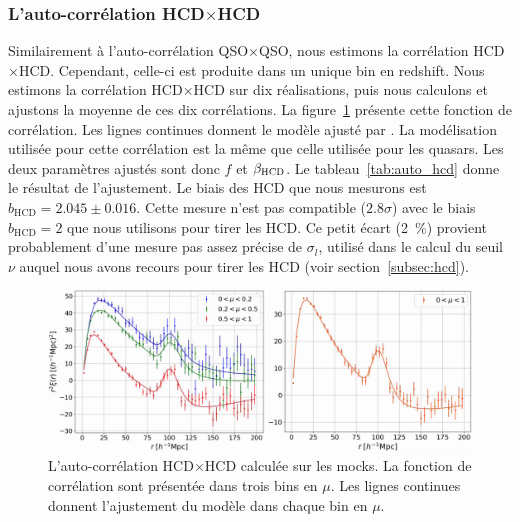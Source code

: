
\subsubsection{L'auto-corrélation HCD$\times$HCD}

Similairement à l'auto-corrélation QSO$\times$QSO, nous estimons la corrélation HCD$\times$HCD. Cependant, celle-ci est produite dans un unique bin en redshift. Nous estimons la corrélation HCD$\times$HCD sur dix réalisations, puis nous calculons et ajustons la moyenne de ces dix corrélations.
La figure~\ref{fig:auto_hcd} présente cette fonction de corrélation. Les lignes continues donnent le modèle ajusté par \picca{}.
La modélisation utilisée pour cette corrélation est la même que celle utilisée pour les quasars. Les deux paramètres ajustés sont donc $f$ et $\beta_{\textsc{HCD}}$.
Le tableau~\ref{tab:auto_hcd} donne le résultat de l'ajustement.
Le biais des HCD que nous mesurons est $b_{\mathrm{HCD}} = \num{2.045} \pm \num{0.016}$.
Cette mesure n'est pas compatible ($\num{2.8}\sigma$) avec le biais $b_{\mathrm{HCD}} = 2$ que nous utilisons pour tirer les HCD. 
Ce petit écart (\SI{2}{\percent}) provient probablement d'une mesure pas assez précise de $\sigma_l$, utilisé dans le calcul du seuil $\nu$ auquel nous avons recours pour tirer les HCD (voir section~\ref{subsec:hcd}).

\begin{figure}
  \centering
  \includegraphics[scale=0.42]{auto_hcd}
  \caption{L'auto-corrélation HCD$\times$HCD calculée sur les mocks. La fonction de corrélation sont présentée dans trois bins en $\mu$. Les lignes continues donnent l'ajustement du modèle dans chaque bin en $\mu$.}
  \label{fig:auto_hcd}
\end{figure}


